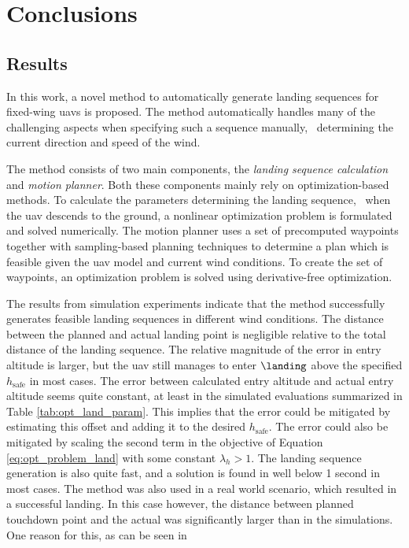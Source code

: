\chapter{Conclusions}\label{cha:discussion}
\section{Results}
In this work, a novel method to automatically generate landing sequences for fixed-wing \acp{uav} is proposed. 
The method automatically handles many of the challenging aspects when specifying such a sequence manually, \eg\ determining the current 
direction and speed of the wind.

The method consists of two main components, the \textit{landing sequence calculation} and \textit{motion planner}. Both these components mainly rely on optimization-based methods. 
To calculate the parameters determining the landing sequence, \ie\ when the \ac{uav} descends to the ground, a nonlinear optimization problem is 
formulated and solved numerically. The motion planner uses a set of precomputed waypoints together with sampling-based planning techniques to determine a plan which is feasible given the 
\ac{uav} model and current wind conditions. To create the set of waypoints, an optimization problem is solved using derivative-free optimization.

The results from simulation experiments indicate that the method successfully generates feasible landing 
sequences in different wind conditions. The distance between the planned and actual landing point is negligible relative to the total distance of the landing sequence.
The relative magnitude of the error in entry altitude is larger, but the \ac{uav} still manages to enter $\landing$ above the specified $h_{\text{safe}}$ in most cases. 
The error between calculated entry altitude and actual entry altitude seems quite constant, at least in the simulated evaluations summarized in Table \ref{tab:opt_land_param}. 
This implies that the error could be mitigated by estimating this offset and adding it to the desired $h_{\text{safe}}$. The error could also be mitigated by scaling the second term in the objective of 
Equation \ref{eq:opt_problem_land} with some constant $\lambda_h>1$. The landing sequence generation is also quite fast, and a solution is found in well below 1 second in most cases.
The method was also used in a real world scenario, which resulted in a successful landing. In this case however, the distance between planned touchdown point and the actual was significantly larger than 
in the simulations. One reason for this, as can be seen in 


